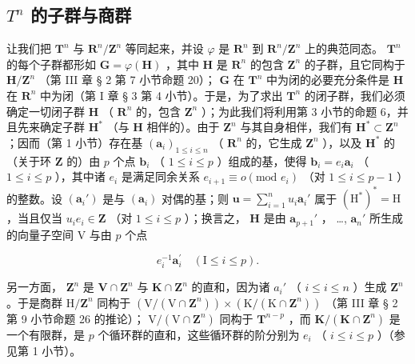 \subsection{\texorpdfstring{\(T^{n}\) 的子群与商群}{T 的 n 次幂的子群与商群}}

让我们把 \(\mathbf{T}^n\) 与 \(\mathbf{R}^n/\mathbf{Z}^n\) 等同起来，并设 \(\varphi\) 是 \(\mathbf{R}^n\) 到 \(\mathbf{R}^n/\mathbf{Z}^n\) 上的典范同态。 \(\mathbf{T}^n\) 的每个子群都形如 \(\mathbf{G} = \varphi(\mathbf{H})\) ，其中 \(\mathbf{H}\) 是 \(\mathbf{R}^n\) 的包含 \(\mathbf{Z}^n\) 的子群，且它同构于 \(\mathbf{H}/\mathbf{Z}^n\) （第 III 章 § 2 第 7 小节命题 20）； \(\mathbf{G}\) 在 \(\mathbf{T}^n\) 中为闭的必要充分条件是 \(\mathbf{H}\) 在 \(\mathbf{R}^n\) 中为闭（第 I 章 § 3 第 4 小节）。于是，为了求出 \(\mathbf{T}^n\) 的闭子群，我们必须确定一切闭子群 \(\mathbf{H}\) （ \(\mathbf{R}^n\) 的，包含 \(\mathbf{Z}^n\) ）；为此我们将利用第 3 小节的命题 6，并且先来确定子群 \(\mathbf{H}^*\) （与 \(\mathbf{H}\) 相伴的）。由于 \(\mathbf{Z}^n\) 与其自身相伴，我们有 \(\mathbf{H}^* \subset \mathbf{Z}^n\) ；因而（第 1 小节）存在基 \((\boldsymbol{a}_i)_{1 \leqslant i \leqslant n}\) （ \(\mathbf{R}^n\) 的，它生成 \(\mathbf{Z}^n\) ），以及 \(\mathbf{H}^*\) 的（关于环 \(\mathbf{Z}\) 的）由 \(p\) 个点 \(\boldsymbol{b}_i\) （ \(1 \leqslant i \leqslant p\) ）组成的基，使得 \(\boldsymbol{b}_i = e_i \boldsymbol{a}_i\) （ \(1 \leqslant i \leqslant p\) ），其中诸 \(e_i\) 是满足同余关系 \(e_{i+1} \equiv o (\text{mod } e_i)\) （对 \(1 \leqslant i \leqslant p - 1\) ）的整数。设 \((\boldsymbol{a}_i')\) 是与 \((\boldsymbol{a}_i)\) 对偶的基；则 \(\boldsymbol{u} = \sum_{i=1}^{n} u_i \boldsymbol{a}_i'\) 属于 \((\mathrm{H}^*)^* = \mathrm{H}\) ，当且仅当 \(u_i e_i \in \mathbf{Z}\) （对 \(1 \leqslant i \leqslant p\) ）；换言之， \(\mathbf{H}\) 是由 \(\boldsymbol{a}_{p+1}'\) ， \ldots, \(\boldsymbol{a}_n'\) 所生成的向量子空间 V 与由 \(p\) 个点

\[
e _ {i} ^ {- 1} \boldsymbol {a} _ {i} ^ {\prime} \quad (\mathrm{I} \leqslant i \leqslant p).
\]

另一方面， \(\mathbf{Z}^n\) 是 \(\mathbf{V} \cap \mathbf{Z}^n\) 与 \(\mathbf{K} \cap \mathbf{Z}^n\) 的直和，因为诸 \(a_i'\) （ \(i \leqslant i \leqslant n\) ）生成 \(\mathbf{Z}^n\) 。于是商群 \(\mathrm{H} / \mathbf{Z}^n\) 同构于 \((\mathrm{V} / (\mathrm{V} \cap \mathbf{Z}^n)) \times (\mathrm{K} / (\mathrm{K} \cap \mathbf{Z}^n))\) （第 III 章 § 2 第 9 小节命题 26 的推论）； \(\mathrm{V} / (\mathrm{V} \cap \mathbf{Z}^n)\) 同构于 \(\mathbf{T}^{n-p}\) ，而 \(\mathbf{K} / (\mathbf{K} \cap \mathbf{Z}^n)\) 是一个有限群，是 \(p\) 个循环群的直和，这些循环群的阶分别为 \(e_i\) （ \(i \leqslant i \leqslant p\) ）（参见第 1 小节）。


